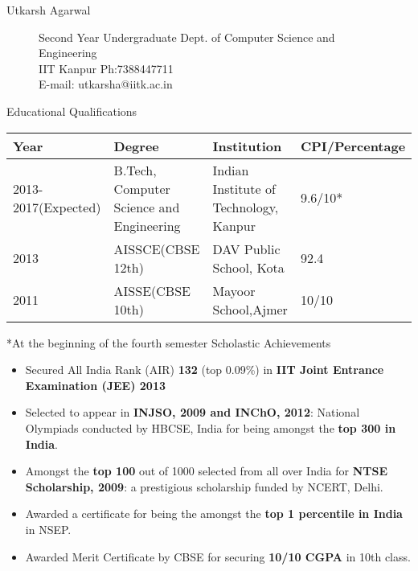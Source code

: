 \documentclass{article}
\begin{document}
\sffamily
\begin{flushleft}
{\Huge{Utkarsh Agarwal}}
\end{flushleft}
\vspace{-1cm}
\begin{figure}[ht]
\begin{minipage}[b]{0.35\linewidth}
\begin{flushleft}
{\small Second Year Undergraduate \newline
       Dept. of Computer Science and Engineering\\
       IIT Kanpur\newline
       Ph:7388447711\\
       E-mail: utkarsha@iitk.ac.in\newline }
\end{flushleft}
\end{minipage}
\hspace{4cm}
\begin{minipage}[b]{0.55\linewidth}
\centering

\end{minipage}
\end{figure}
{\Large Educational Qualifications}
\newline
\newline
\begin{tabular}{| l | l | l |l|}
\hline
Year         & Degree & Institution & CPI/Percentage\\ \hline
2013-2017(Expected) & B.Tech, Computer Science and Engineering & Indian Institute of Technology, Kanpur & 9.6/10*\\ \hline
2013 & AISSCE(CBSE 12th) & DAV Public School, Kota & 92.4 \\ \hline
2011 & AISSE(CBSE 10th) & Mayoor School,Ajmer & 10/10\\ \hline
\end{tabular}
*At the beginning of the fourth semester \newline\newline\newline
{\Large Scholastic Achievements}
	\begin{itemize}
\item Secured All India Rank (AIR) \textbf {132} (top 0.09\%) in \textbf {IIT Joint Entrance Examination (JEE) 2013} 
\item Selected to appear in \textbf{INJSO, 2009 and INChO, 2012}: National Olympiads conducted by HBCSE, India for being amongst the \textbf{top 300 in India}.
\item Amongst the \textbf{top 100} out of 1000 selected from all over India for \textbf{NTSE Scholarship, 2009}: a prestigious scholarship funded by NCERT, Delhi.
\item Awarded a certificate for being the amongst the \textbf{top 1 percentile in India} in  NSEP.
\item Awarded Merit Certificate by CBSE for securing \textbf{10/10 CGPA} in 10th class.
	\end{itemize}
\end{document}

